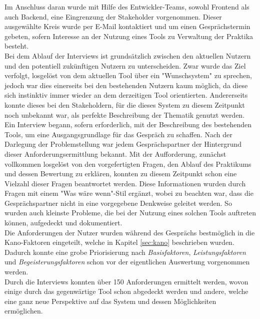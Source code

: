 Im Anschluss daran wurde mit Hilfe des Entwickler-Teams, sowohl Frontend als auch Backend, eine Eingrenzung der Stakeholder vorgenommen. Dieser ausgewählte Kreis wurde per E-Mail kontaktiert und um einen Gesprächstermin gebeten, sofern Interesse an der Nutzung eines Tools zu Verwaltung der Praktika besteht. \\

Bei dem Ablauf der Interviews ist grundsätzlich zwischen den aktuellen Nutzern und den potentiell zukünftigen Nutzern zu unterscheiden. Zwar wurde das Ziel verfolgt, losgelöst von dem aktuellen Tool über ein "Wunschsystem" zu sprechen, jedoch war dies einerseits bei den bestehenden Nutzern kaum möglich, da diese sich instinktiv immer wieder an dem derzeitigen Tool orientierten. Andererseits konnte dieses bei den Stakeholdern, für die dieses System zu diesem Zeitpunkt noch unbekannt war, als perfekte Beschreibung der Thematik genutzt werden.\\

Ein Interview begann, sofern erforderlich, mit der Beschreibung des bestehenden Tools, um eine Ausgangsgrundlage für das Gespräch zu schaffen. Nach der Darlegung der Problemstellung war jedem Gesprächspartner der Hintergrund dieser Anforderungsermittlung bekannt. Mit der Aufforderung, zunächst vollkommen losgelöst von den vorgefertigten Fragen, den Ablauf des Praktikums und dessen Bewertung zu erklären, konnten zu diesem Zeitpunkt schon eine Vielzahl dieser Fragen beantwortet werden. Diese Informationen wurden durch Fragen mit einem "Was wäre wenn"-Stil ergänzt, wobei zu beachten war, dass die Gesprächspartner nicht in eine vorgegebene Denkweise geleitet werden. So wurden auch kleinste Probleme, die bei der Nutzung eines solchen Tools auftreten können, aufgedeckt und dokumentiert.\\

Die Anforderungen der Nutzer wurden während des Gesprächs bestmöglich in die Kano-Faktoren eingeteilt, welche in Kapitel \ref{sec:kano} beschrieben wurden. Dadurch konnte eine grobe Priorisierung nach \textit{Basisfaktoren}, \textit{Leistungsfaktoren} und \textit{Begeisterungsfaktoren} schon vor der eigentlichen Auswertung vorgenommen werden.\\

Durch die Interviews konnten über 150 Anforderungen ermittelt werden, wovon einige durch das gegenwärtige Tool schon abgedeckt werden und andere, welche eine ganz neue Perspektive auf das System und dessen Möglichkeiten ermöglichen.


